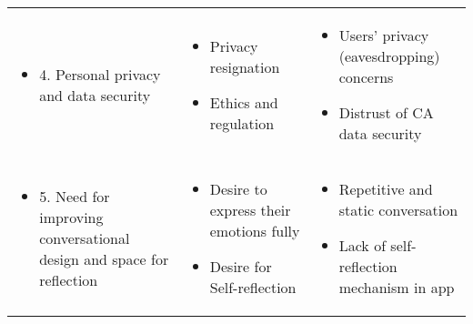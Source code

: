 \begin{table}[h]
\begin{tabular}{p{3.20cm} p{4.65cm} p{4.65cm}}
            
    
            
            \begin{itemize}[leftmargin=0em]
                \item[] 4. Personal privacy and data security
            \end{itemize}
        & 
            \begin{itemize}[leftmargin=1em]
              \item Privacy resignation 
              \item Ethics and regulation
            \end{itemize}
        &  
            \begin{itemize}[leftmargin=1em]
                \item Users' privacy (eavesdropping) concerns
                \item Distrust of \ac{CA} data security
            \end{itemize} \\ 
            
            
            \begin{itemize}[leftmargin=0em]
                \item[] 5. Need for improving conversational design and space for reflection
            \end{itemize}
        & 
            \begin{itemize}[leftmargin=1em]
              \item Desire to express their emotions fully
              \item Desire for Self-reflection
            \end{itemize}
        &  
            \begin{itemize}[leftmargin=1em]
                \item Repetitive and static conversation
                \item Lack of self-reflection mechanism in \acl{app}
            \end{itemize} \\
            
        
        \bottomrule
    \end{tabular}
    \label{tab:theme_summary}
\end{table}
